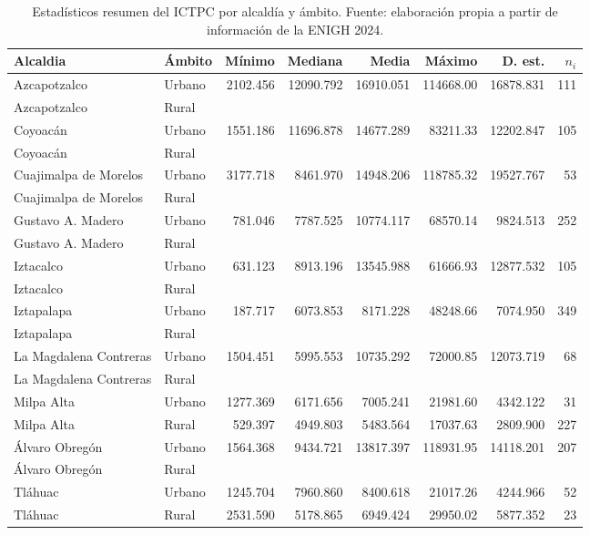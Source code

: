 \documentclass[11pt]{article}
\begin{document}
\begin{table}[H]
\caption{Estadísticos resumen del ICTPC por alcaldía y ámbito. Fuente: elaboración propia a partir de información de la ENIGH 2024.}
\label{tab:descripcion_alcaldia}
\centering
\begin{tabular}{ll *{6}{r}}
\hline
Alcaldia & Ámbito & Mínimo & Mediana & Media & Máximo & D. est. & $n_{i}$ \\
\hline
Azcapotzalco & Urbano & 2102.456 & 12090.792 & 16910.051 & 114668.00 & 16878.831 & 111\\
Azcapotzalco & Rural &  &  &  &  &  & \\
Coyoacán & Urbano & 1551.186 & 11696.878 & 14677.289 & 83211.33 & 12202.847 & 105\\
Coyoacán & Rural &  &  &  &  &  & \\
Cuajimalpa de Morelos & Urbano & 3177.718 & 8461.970 & 14948.206 & 118785.32 & 19527.767 & 53\\
Cuajimalpa de Morelos & Rural &  &  &  &  &  & \\
Gustavo A. Madero & Urbano & 781.046 & 7787.525 & 10774.117 & 68570.14 & 9824.513 & 252\\
Gustavo A. Madero & Rural &  &  &  &  &  & \\
Iztacalco & Urbano & 631.123 & 8913.196 & 13545.988 & 61666.93 & 12877.532 & 105\\
Iztacalco & Rural &  &  &  &  &  & \\
Iztapalapa & Urbano & 187.717 & 6073.853 & 8171.228 & 48248.66 & 7074.950 & 349\\
Iztapalapa & Rural &  &  &  &  &  & \\
La Magdalena Contreras & Urbano & 1504.451 & 5995.553 & 10735.292 & 72000.85 & 12073.719 & 68\\
La Magdalena Contreras & Rural &  &  &  &  &  & \\
Milpa Alta & Urbano & 1277.369 & 6171.656 & 7005.241 & 21981.60 & 4342.122 & 31\\
Milpa Alta & Rural & 529.397 & 4949.803 & 5483.564 & 17037.63 & 2809.900 & 227\\
Álvaro Obregón & Urbano & 1564.368 & 9434.721 & 13817.397 & 118931.95 & 14118.201 & 207\\
Álvaro Obregón & Rural &  &  &  &  &  & \\
Tláhuac & Urbano & 1245.704 & 7960.860 & 8400.618 & 21017.26 & 4244.966 & 52\\
Tláhuac & Rural & 2531.590 & 5178.865 & 6949.424 & 29950.02 & 5877.352 & 23\\

\end{tabular}
\end{table}
\end{document}

